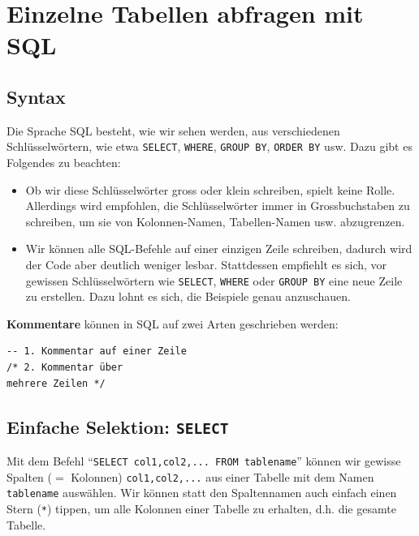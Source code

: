 \section{Einzelne Tabellen abfragen mit \texorpdfstring{\gls{SQL}}{SQL}}

\subsection{Syntax}
Die Sprache \acrfull{SQL} besteht, wie wir sehen werden, aus verschiedenen Schlüsselwörtern, wie etwa \lstinline[style=sql]|SELECT|, \lstinline[style=sql]|WHERE|, \lstinline[style=sql]|GROUP BY|, \lstinline[style=sql]|ORDER BY| usw. Dazu gibt es Folgendes zu beachten:
\begin{itemize}
  \item Ob wir diese Schlüsselwörter gross oder klein schreiben, spielt keine Rolle. Allerdings wird empfohlen, die Schlüsselwörter immer in Grossbuchstaben zu schreiben, um sie von Kolonnen-Namen, Tabellen-Namen usw. abzugrenzen.
  \item Wir können alle \gls{SQL}-Befehle auf einer einzigen Zeile schreiben, dadurch wird der Code aber deutlich weniger lesbar. Stattdessen empfiehlt es sich, vor gewissen Schlüsselwörtern wie \lstinline[style=sql]|SELECT|, \lstinline[style=sql]|WHERE| oder \lstinline[style=sql]|GROUP BY| eine neue Zeile zu erstellen. Dazu lohnt es sich, die Beispiele genau anzuschauen.
\end{itemize}

\textbf{Kommentare} können in \gls{SQL}  auf zwei Arten geschrieben werden:

\begin{lstlisting}[style=sql]
-- 1. Kommentar auf einer Zeile
/* 2. Kommentar über
mehrere Zeilen */
\end{lstlisting}

\subsection{Einfache Selektion: \texorpdfstring{\lstinline[style=sql]|SELECT|}{SELECT}}

Mit dem Befehl \enquote{\lstinline[style=sql]|SELECT col1,col2,... FROM tablename|} können wir gewisse Spalten ($=$ Kolonnen) \lstinline[style=sql]|col1,col2,...| aus einer Tabelle mit dem Namen \lstinline[style=sql]|tablename| auswählen. Wir können statt den Spaltennamen auch einfach einen Stern (\texttt{*}) tippen, um alle Kolonnen einer Tabelle zu erhalten, d.h. die gesamte Tabelle.



